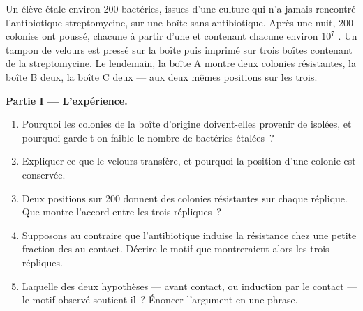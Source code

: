 \begin{problem}
\label{pb:g11:mutations:1}
Un élève étale environ 200 bactéries, issues d'une culture qui n'a
jamais rencontré l'antibiotique streptomycine, sur une boîte sans
antibiotique. Après une nuit, 200 colonies ont poussé, chacune à partir
d'une  et contenant chacune environ $10^7$ . Un tampon
de velours est pressé sur la boîte puis imprimé sur trois boîtes
contenant de la streptomycine. Le lendemain, la boîte A montre deux
colonies résistantes, la boîte B deux, la boîte C deux --- aux deux
mêmes positions sur les trois.

\medskip
\noindent\textbf{Partie I --- L'expérience.}
\begin{enumerate}
  \item Pourquoi les colonies de la boîte d'origine doivent-elles
        provenir de  isolées, et pourquoi garde-t-on faible le
        nombre de bactéries étalées~?
  \item Expliquer ce que le velours transfère, et pourquoi la position
        d'une colonie est conservée.
  \item Deux positions sur 200 donnent des colonies résistantes sur
        chaque réplique. Que montre l'accord entre les trois
        répliques~?
  \item Supposons au contraire que l'antibiotique induise la
        résistance chez une petite fraction des  au contact.
        Décrire le motif que montreraient alors les trois répliques.
  \item Laquelle des deux hypothèses ---  avant contact, ou
        induction par le contact --- le motif observé soutient-il~?
        Énoncer l'argument en une phrase.
\end{enumerate}


\end{problem}
